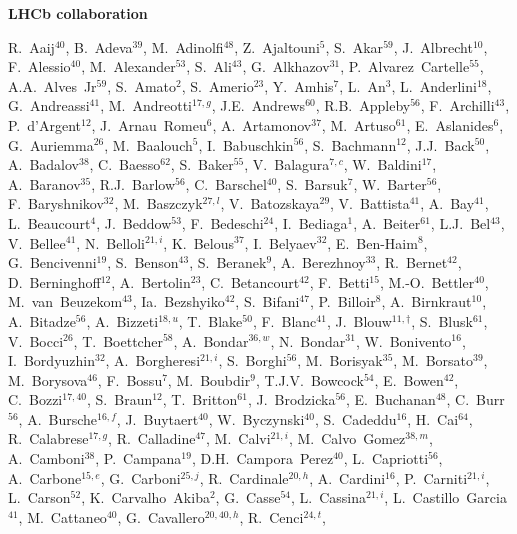 \documentclass[12pt,a4paper]{article}
\begin{document}
\clearpage
\centerline{\large\bf LHCb collaboration}
\begin{flushleft}
\small
R.~Aaij$^{40}$,
B.~Adeva$^{39}$,
M.~Adinolfi$^{48}$,
Z.~Ajaltouni$^{5}$,
S.~Akar$^{59}$,
J.~Albrecht$^{10}$,
F.~Alessio$^{40}$,
M.~Alexander$^{53}$,
S.~Ali$^{43}$,
G.~Alkhazov$^{31}$,
P.~Alvarez~Cartelle$^{55}$,
A.A.~Alves~Jr$^{59}$,
S.~Amato$^{2}$,
S.~Amerio$^{23}$,
Y.~Amhis$^{7}$,
L.~An$^{3}$,
L.~Anderlini$^{18}$,
G.~Andreassi$^{41}$,
M.~Andreotti$^{17,g}$,
J.E.~Andrews$^{60}$,
R.B.~Appleby$^{56}$,
F.~Archilli$^{43}$,
P.~d'Argent$^{12}$,
J.~Arnau~Romeu$^{6}$,
A.~Artamonov$^{37}$,
M.~Artuso$^{61}$,
E.~Aslanides$^{6}$,
G.~Auriemma$^{26}$,
M.~Baalouch$^{5}$,
I.~Babuschkin$^{56}$,
S.~Bachmann$^{12}$,
J.J.~Back$^{50}$,
A.~Badalov$^{38}$,
C.~Baesso$^{62}$,
S.~Baker$^{55}$,
V.~Balagura$^{7,c}$,
W.~Baldini$^{17}$,
A.~Baranov$^{35}$,
R.J.~Barlow$^{56}$,
C.~Barschel$^{40}$,
S.~Barsuk$^{7}$,
W.~Barter$^{56}$,
F.~Baryshnikov$^{32}$,
M.~Baszczyk$^{27,l}$,
V.~Batozskaya$^{29}$,
V.~Battista$^{41}$,
A.~Bay$^{41}$,
L.~Beaucourt$^{4}$,
J.~Beddow$^{53}$,
F.~Bedeschi$^{24}$,
I.~Bediaga$^{1}$,
A.~Beiter$^{61}$,
L.J.~Bel$^{43}$,
V.~Bellee$^{41}$,
N.~Belloli$^{21,i}$,
K.~Belous$^{37}$,
I.~Belyaev$^{32}$,
E.~Ben-Haim$^{8}$,
G.~Bencivenni$^{19}$,
S.~Benson$^{43}$,
S.~Beranek$^{9}$,
A.~Berezhnoy$^{33}$,
R.~Bernet$^{42}$,
D.~Berninghoff$^{12}$,
A.~Bertolin$^{23}$,
C.~Betancourt$^{42}$,
F.~Betti$^{15}$,
M.-O.~Bettler$^{40}$,
M.~van~Beuzekom$^{43}$,
Ia.~Bezshyiko$^{42}$,
S.~Bifani$^{47}$,
P.~Billoir$^{8}$,
A.~Birnkraut$^{10}$,
A.~Bitadze$^{56}$,
A.~Bizzeti$^{18,u}$,
T.~Blake$^{50}$,
F.~Blanc$^{41}$,
J.~Blouw$^{11,\dagger}$,
S.~Blusk$^{61}$,
V.~Bocci$^{26}$,
T.~Boettcher$^{58}$,
A.~Bondar$^{36,w}$,
N.~Bondar$^{31}$,
W.~Bonivento$^{16}$,
I.~Bordyuzhin$^{32}$,
A.~Borgheresi$^{21,i}$,
S.~Borghi$^{56}$,
M.~Borisyak$^{35}$,
M.~Borsato$^{39}$,
M.~Borysova$^{46}$,
F.~Bossu$^{7}$,
M.~Boubdir$^{9}$,
T.J.V.~Bowcock$^{54}$,
E.~Bowen$^{42}$,
C.~Bozzi$^{17,40}$,
S.~Braun$^{12}$,
T.~Britton$^{61}$,
J.~Brodzicka$^{56}$,
E.~Buchanan$^{48}$,
C.~Burr$^{56}$,
A.~Bursche$^{16,f}$,
J.~Buytaert$^{40}$,
W.~Byczynski$^{40}$,
S.~Cadeddu$^{16}$,
H.~Cai$^{64}$,
R.~Calabrese$^{17,g}$,
R.~Calladine$^{47}$,
M.~Calvi$^{21,i}$,
M.~Calvo~Gomez$^{38,m}$,
A.~Camboni$^{38}$,
P.~Campana$^{19}$,
D.H.~Campora~Perez$^{40}$,
L.~Capriotti$^{56}$,
A.~Carbone$^{15,e}$,
G.~Carboni$^{25,j}$,
R.~Cardinale$^{20,h}$,
A.~Cardini$^{16}$,
P.~Carniti$^{21,i}$,
L.~Carson$^{52}$,
K.~Carvalho~Akiba$^{2}$,
G.~Casse$^{54}$,
L.~Cassina$^{21,i}$,
L.~Castillo~Garcia$^{41}$,
M.~Cattaneo$^{40}$,
G.~Cavallero$^{20,40,h}$,
R.~Cenci$^{24,t}$,

\end{flushleft}
\end{document}
